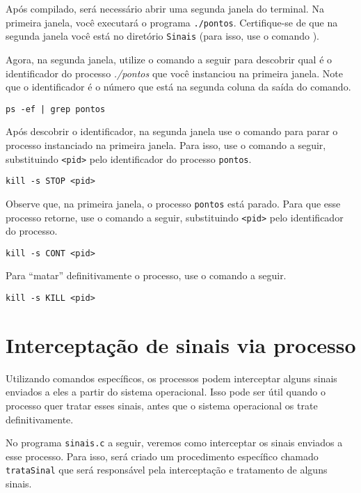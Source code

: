 Após compilado, será necessário abrir uma segunda janela do terminal. Na primeira janela, você executará o programa \texttt{./pontos}. Certifique-se de que na segunda janela você está no diretório \texttt{Sinais} (para isso, use o comando ).

Agora, na segunda janela, utilize o comando a seguir para descobrir qual é o identificador do processo \textit{./pontos} que você instanciou na primeira janela. Note que o identificador é o número que está na segunda coluna da saída do comando.

\begin{lstlisting}[style=MyBashStyle]
ps -ef | grep pontos
\end{lstlisting}

Após descobrir o identificador, na segunda janela use o comando  para parar o processo instanciado na primeira janela. Para isso, use o comando a seguir, substituindo \texttt{<pid>} pelo identificador do processo \texttt{pontos}.

\begin{lstlisting}[style=MyBashStyle]
kill -s STOP <pid>
\end{lstlisting}

Observe que, na primeira janela, o processo \texttt{pontos} está parado. Para que esse processo retorne, use o comando a seguir, substituindo \texttt{<pid>} pelo identificador do processo.

\begin{lstlisting}[style=MyBashStyle]
kill -s CONT <pid>
\end{lstlisting}

Para \enquote{matar} definitivamente o processo, use o comando a seguir.

\begin{lstlisting}[style=MyBashStyle]
kill -s KILL <pid>
\end{lstlisting}


\section{Interceptação de sinais via processo}
Utilizando comandos específicos, os processos podem interceptar alguns sinais enviados a eles a partir do sistema operacional. Isso pode ser útil quando o processo quer tratar esses sinais, antes que o sistema operacional os trate definitivamente.

No programa \texttt{sinais.c} a seguir, veremos como interceptar os sinais enviados a esse processo. Para isso, será criado um procedimento específico chamado \texttt{trataSinal} que será responsável pela interceptação e tratamento de alguns sinais.


